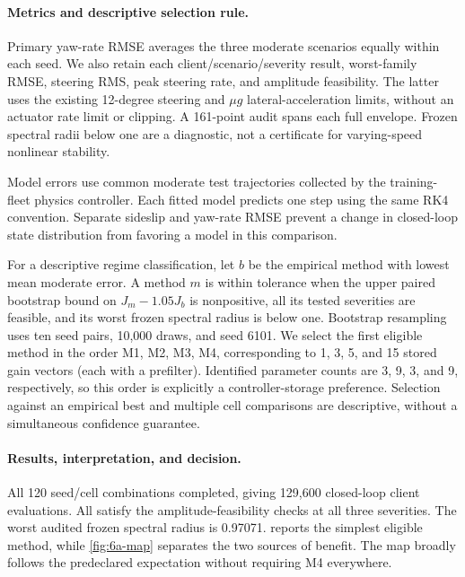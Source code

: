 \paragraph{Metrics and descriptive selection rule.}
Primary yaw-rate RMSE averages the three moderate scenarios equally within
each seed. We also retain each client/scenario/severity result, worst-family
RMSE, steering RMS, peak steering rate, and amplitude feasibility. The latter
uses the existing 12-degree steering and $\mu g$ lateral-acceleration limits,
without an actuator rate limit or clipping. A 161-point audit spans each full
envelope. Frozen spectral radii below one are a diagnostic, not a certificate
for varying-speed nonlinear stability.

Model errors use common moderate test trajectories collected by the
training-fleet physics controller. Each fitted model predicts one step using
the same RK4 convention. Separate sideslip and yaw-rate RMSE prevent a change
in closed-loop state distribution from favoring a model in this comparison.

For a descriptive regime classification, let $b$ be the empirical method with
lowest mean moderate error. A method $m$ is within tolerance when the upper
paired bootstrap bound on $J_m-1.05J_b$ is nonpositive, all its tested severities
are feasible, and its worst frozen spectral radius is below one. Bootstrap
resampling uses ten seed pairs, 10,000 draws, and seed 6101. We select the first
eligible method in the order M1, M2, M3, M4, corresponding to 1, 3, 5, and 15
stored gain vectors (each with a prefilter). Identified parameter counts are
3, 9, 3, and 9, respectively, so this order is explicitly a controller-storage
preference. Selection against an empirical best and multiple cell comparisons
are descriptive, without a simultaneous confidence guarantee.

\paragraph{Results, interpretation, and decision.}
All 120 seed/cell combinations completed, giving 129,600 closed-loop
client evaluations. All satisfy the amplitude-feasibility checks at all three
severities. The worst audited frozen spectral radius is 0.97071.
 reports the simplest eligible method, while
\cref{fig:6a-map} separates the two sources of benefit. The map broadly follows
the predeclared expectation without requiring M4 everywhere.

